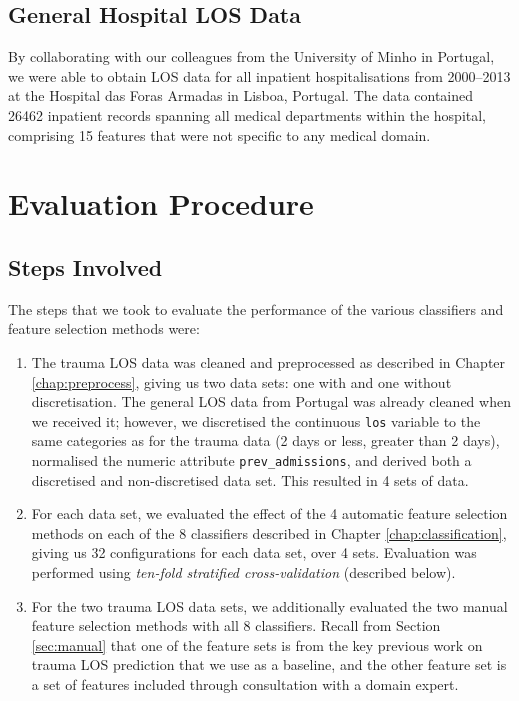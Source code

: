 \subsection{General Hospital LOS Data}
By collaborating with our colleagues from the University of Minho in Portugal,
we were able to obtain LOS data for all inpatient hospitalisations from
2000--2013 at the Hospital das Foras Armadas in Lisboa, Portugal. The data
contained 26462 inpatient records spanning all medical departments within the
hospital, comprising 15 features that were not specific to any medical domain.

\section{Evaluation Procedure}
\subsection{Steps Involved}
The steps that we took to evaluate the performance of the various classifiers
and feature selection methods were:
\begin{enumerate}
\item The trauma LOS data was cleaned and preprocessed as described in Chapter
\ref{chap:preprocess}, giving us two data sets: one with and one without
discretisation. The general LOS data from Portugal was already cleaned when we
received it; however, we discretised the continuous \texttt{los} variable to
the same categories as for the trauma data (2 days or less, greater than 2
days), normalised the numeric attribute \texttt{prev\_admissions}, and derived
both a discretised and non-discretised data set. This resulted in 4 sets of
data.
\item For each data set, we evaluated the effect of the 4 automatic feature
selection methods on each of the 8 classifiers described in Chapter
\ref{chap:classification}, giving us 32 configurations for each data set, over
4 sets. Evaluation was performed using \textit{ten-fold stratified
cross-validation} (described below).
\item For the two trauma LOS data sets, we additionally evaluated the two
manual feature selection methods with all 8 classifiers. Recall from Section
\ref{sec:manual} that one of the feature sets is from the key previous work
on trauma LOS prediction that we use as a baseline, and the other feature set
is a set of features included through consultation with a domain expert.
\end{enumerate}

